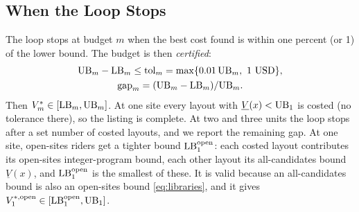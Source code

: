 \subsection{When the Loop Stops}\label{sec:method:search}
The loop stops at budget $m$ when the best cost found is within one percent (or 1\usd{}) of the lower bound. The budget is then \emph{certified}:
\begin{equation}\label{eq:certificate}
  \begin{gathered}
  \mathrm{UB}_m-\mathrm{LB}_m\le\mathrm{tol}_m=\max\{0.01\,\mathrm{UB}_m,\ 1\ \text{USD}\},\\
  \mathrm{gap}_m=(\mathrm{UB}_m-\mathrm{LB}_m)/\mathrm{UB}_m .
  \end{gathered}
\end{equation}
Then $V^*_m\in[\mathrm{LB}_m,\mathrm{UB}_m]$. At one site every layout with $\underline V(x)<\mathrm{UB}_1$ is costed (no tolerance there), so the listing is complete. At two and three units the loop stops after a set number of costed layouts, and we report the remaining gap. At one site, open-sites riders get a tighter bound $\mathrm{LB}^{\mathrm{open}}_1$: each costed layout contributes its open-sites integer-program bound, each other layout its all-candidates bound $\underline V(x)$, and $\mathrm{LB}^{\mathrm{open}}_1$ is the smallest of these. It is valid because an all-candidates bound is also an open-sites bound \eqref{eq:libraries}, and it gives $V^{*,\mathrm{open}}_1\in[\mathrm{LB}^{\mathrm{open}}_1,\mathrm{UB}_1]$.

